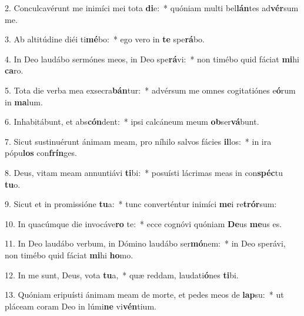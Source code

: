 2. Conculcavérunt me inimíci mei tota \textbf{di}e:~*  quóniam multi bel\textbf{lán}tes ad\textbf{vér}sum me.\

3. Ab altitúdine diéi ti\textbf{mé}bo:~*  ego vero in \textbf{te} spe\textbf{rá}bo.\

4. In Deo laudábo sermónes meos, in Deo spe\textbf{rá}vi:~*  non timébo quid fáciat \textbf{mi}hi \textbf{ca}ro.\

5. Tota die verba mea exsecra\textbf{bán}tur:~*  advérsum me omnes cogitatiónes e\textbf{ó}rum in \textbf{ma}lum.\

6. Inhabitábunt, et abs\textbf{cón}dent:~*  ipsi calcáneum meum \textbf{ob}ser\textbf{vá}bunt.\

7. Sicut sustinuérunt ánimam meam, pro níhilo salvos fácies \textbf{il}los:~*  in ira pópu\textbf{los} con\textbf{frín}ges.\

8. Deus, vitam meam annuntiávi \textbf{ti}bi:~*  posuísti lácrimas meas in con\textbf{spéc}tu \textbf{tu}o.\

9. Sicut et in promissióne \textbf{tu}a:~*  tunc converténtur inimíci \textbf{me}i re\textbf{trór}sum:\

10. In quacúmque die invocáve\textbf{ro} te:~*  ecce cognóvi quóniam \textbf{De}us \textbf{me}us es.\

11. In Deo laudábo verbum, in Dómino laudábo ser\textbf{mó}nem:~*  in Deo sperávi, non timébo quid fáciat \textbf{mi}hi \textbf{ho}mo.\

12. In me sunt, Deus, vota \textbf{tu}a,~*  quæ reddam, laudati\textbf{ó}nes \textbf{ti}bi.\

13. Quóniam eripuísti ánimam meam de morte, et pedes meos de \textbf{lap}su:~*  ut pláceam coram Deo in lúmi\textbf{ne} vi\textbf{vén}tium.\

